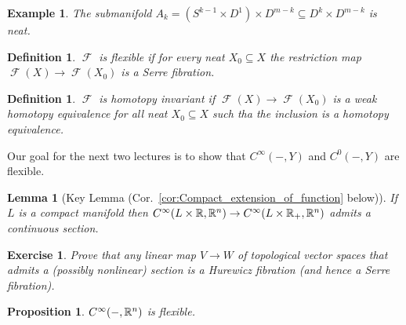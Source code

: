 \documentclass{article}
\newtheorem{proposition}[theorem]{Proposition}
\newtheorem{lemma}[theorem]{Lemma}
\newtheorem{definition}[theorem]{Definition}
\newtheorem{example}[theorem]{Example}
\newtheorem{exercise}[theorem]{Exercise}
\newtheorem{proposed work}[theorem]{Proposed Work}
\theoremstyle{definition}
\DeclareMathOperator{\CF}{\mathcal F}
\begin{document}
\begin{example}
  The submanifold $A_k = (S^{k-1}\times D^1) \times D^{m-k} \subseteq
  D^k\times D^{m-k}$ is neat.
\end{example}

\begin{definition} \label{def:flexible}
  $\CF$ is {\em flexible} if for every neat $X_0\subseteq X$ the
  restriction map $\CF(X)\to \CF(X_0)$ is a Serre fibration.
\end{definition}

\begin{definition} \label{def:htpyinvt}
  $\CF$ is {\em homotopy invariant} if $\CF(X) \to \CF(X_0)$ is a weak
  homotopy equivalence for all neat $X_0\subseteq X$ such tha the inclusion
  is a homotopy equivalence.
\end{definition}

Our goal for the next two lectures is to show that $C^\infty(-,Y)$ and
$C^0(-, Y)$ are flexible.

\begin{lemma}[Key Lemma (Cor.~\ref{cor:Compact_extension_of_function} below)] \label{lem:compactmapstoRn}
  If $L$ is a compact manifold then $C^\infty(L\times\mathbb R, \mathbb R^n) \to
  C^\infty(L\times \mathbb R_+, \mathbb R^n)$ admits a continuous section. 
\end{lemma}

\begin{exercise} \label{ex:vectorspacesection} Prove that any linear
  map $V\to W$ of topological vector spaces that admits a (possibly
  nonlinear) section is a Hurewicz fibration (and hence a Serre
  fibration).
\end{exercise}

\begin{proposition} \label{prop:mapstoRn}
  $C^\infty(-, \mathbb R^n)$ is flexible.
\end{proposition}
\end{document}
